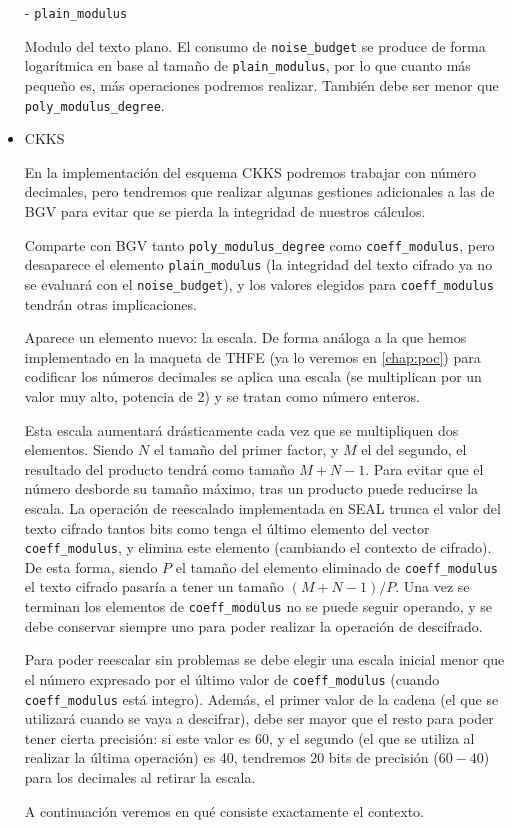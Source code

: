 \begin{itemize}
\begin{table}
    \end{table}

  - \verb|plain_modulus|

  Modulo del texto plano. El consumo de \verb|noise_budget| se produce de forma logarítmica en base al tamaño de \verb|plain_modulus|, por lo que cuanto más pequeño es, más operaciones podremos realizar. También debe ser menor que \verb|poly_modulus_degree|.

  \item CKKS

  En la implementación del esquema CKKS podremos trabajar con número decimales, pero tendremos que realizar algunas gestiones adicionales a las de BGV para evitar que se pierda la integridad de nuestros cálculos.

  Comparte con BGV tanto \verb|poly_modulus_degree| como \verb|coeff_modulus|, pero desaparece el elemento \verb|plain_modulus| (la integridad del texto cifrado ya no se evaluará con el \verb|noise_budget|), y los valores elegidos para \verb|coeff_modulus| tendrán otras implicaciones.

  Aparece un elemento nuevo: la escala. De forma análoga a la que hemos implementado en la maqueta de THFE (ya lo veremos en \ref{chap:poc}) para codificar los números decimales se aplica una escala (se multiplican por un valor muy alto, potencia de 2) y se tratan como número enteros.

  Esta escala aumentará drásticamente cada vez que se multipliquen dos elementos. Siendo $N$ el tamaño del primer factor, y $M$ el del segundo, el resultado del producto tendrá como tamaño $M+N-1$. Para evitar que el número desborde su tamaño máximo, tras un producto puede reducirse la escala. La operación de reescalado implementada en SEAL trunca el valor del texto cifrado tantos bits como tenga el último elemento del vector \verb|coeff_modulus|, y elimina este elemento (cambiando el contexto de cifrado). De esta forma, siendo $P$ el tamaño del elemento eliminado de \verb|coeff_modulus| el texto cifrado pasaría a tener un tamaño $(M+N-1)/P$. Una vez se terminan los elementos de \verb|coeff_modulus| no se puede seguir operando, y se debe conservar siempre uno para poder realizar la operación de descifrado.

  Para poder reescalar sin problemas se debe elegir una escala inicial menor que el número expresado por el último valor de \verb|coeff_modulus| (cuando \verb|coeff_modulus| está integro). Además, el primer valor de la cadena (el que se utilizará cuando se vaya a descifrar), debe ser mayor que el resto para poder tener cierta precisión: si este valor es 60, y el segundo (el que se utiliza al realizar la última operación) es 40, tendremos 20 bits de precisión ($60 - 40$) para los decimales al retirar la escala.

  A continuación veremos en qué consiste exactamente el contexto.

\end{itemize}

